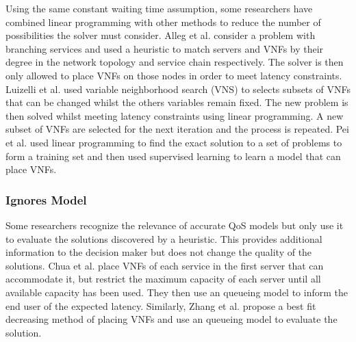 Using the same constant waiting time assumption, some researchers have combined linear programming with other methods to reduce the number of possibilities the solver must consider. Alleg et al. \cite{AllegKMA17} consider a problem with branching services and used a heuristic to match servers and VNFs by their degree in the network topology and service chain respectively. The solver is then only allowed to place VNFs on those nodes in order to meet latency constraints. Luizelli et al. \cite{LuizelliCBG17} used variable neighborhood search (VNS) to selects subsets of VNFs that can be changed whilst the others variables remain fixed. The new problem is then solved whilst meeting latency constraints using linear programming. A new subset of VNFs are selected for the next iteration and the process is repeated. Pei et al. \cite{PeiHXLWW20} used linear programming to find the exact solution to a set of problems to form a training set and then used supervised learning to learn a model that can place VNFs.

\subsubsection{Ignores Model}
Some researchers recognize the relevance of accurate QoS models but only use it to evaluate the solutions discovered by a heuristic. This provides additional information to the decision maker but does not change the quality of the solutions. Chua et al. \cite{ChuaWZSH16} place VNFs of each service in the first server that can accommodate it, but restrict the maximum capacity of each server until all available capacity has been used. They then use an queueing model to inform the end user of the expected latency. Similarly, Zhang et al. \cite{ZhangXLLGW17} propose a best fit decreasing method of placing VNFs and use an queueing model to evaluate the solution.

